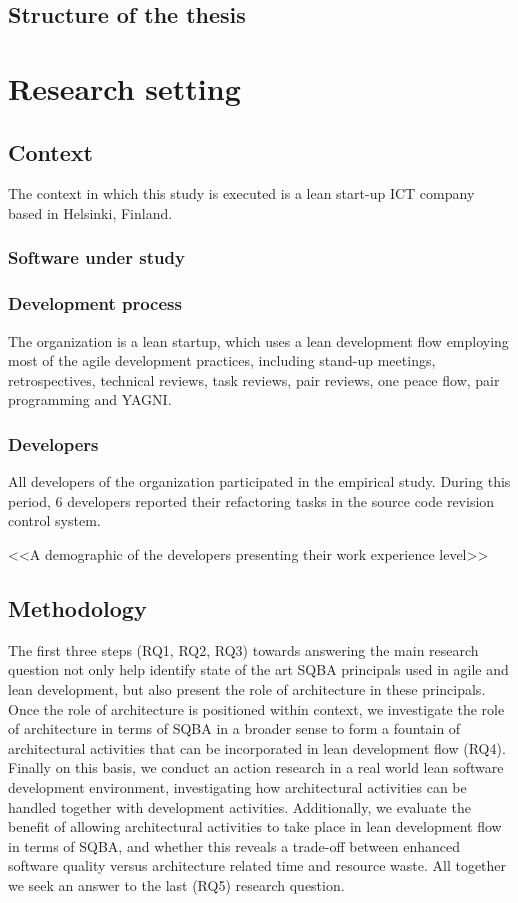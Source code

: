 \documentclass[english,12pt,a4paper,pdftex,sci,utf8]{aaltothesis}
\begin{document}
\subsection{Structure of the thesis} \label{structure}
\clearpage

\section{Research setting} \label{research setting}

\subsection{Context} \label{context}
The context in which this study is executed is a lean start-up ICT company based in Helsinki, Finland.
\subsubsection*{Software under study} \label{software}
\subsubsection*{Development process} \label{process}
The organization is a lean startup, which uses a lean development flow employing most of the agile development practices, including stand-up meetings, retrospectives, technical reviews, task reviews, pair reviews, one peace flow, pair programming and YAGNI. 
\subsubsection*{Developers} \label{developers}
All developers of the organization participated in the empirical study. During this period, 6 developers reported their refactoring tasks in the source code revision control system.

<<A demographic of the developers presenting their work experience level>>

\subsection{Methodology} \label{methodology}
The first three steps (RQ1, RQ2, RQ3) towards answering the main research question not only help identify state of the art SQBA principals used in agile and lean development, but also present the role of architecture in these principals. Once the role of architecture is positioned within context, we investigate the role of architecture in terms of SQBA in a broader sense to form a fountain of architectural activities that can be incorporated in lean development flow (RQ4). Finally on this basis, we conduct an action research in a real world lean software development environment, investigating how architectural activities can be handled together with development activities. Additionally, we evaluate the benefit of allowing architectural activities to take place in lean development flow in terms of SQBA, and whether this reveals a trade-off between enhanced software quality versus architecture related time and resource waste. All together we seek an answer to the last (RQ5) research question. 
\end{document}
